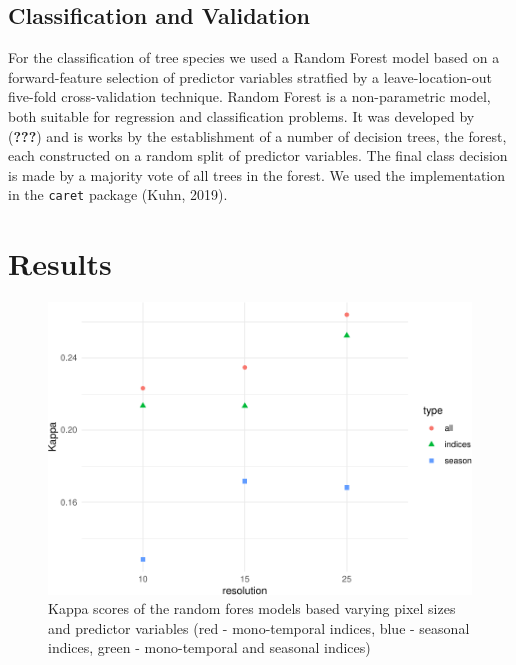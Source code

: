 \documentclass[]{article}
\begin{document}
\hypertarget{classification-and-validation}{%
\subsection{Classification and
Validation}\label{classification-and-validation}}

For the classification of tree species we used a Random Forest model
based on a forward-feature selection of predictor variables stratfied by
a leave-location-out five-fold cross-validation technique. Random Forest
is a non-parametric model, both suitable for regression and
classification problems. It was developed by ({\textbf{???}}) and is
works by the establishment of a number of decision trees, the forest,
each constructed on a random split of predictor variables. The final
class decision is made by a majority vote of all trees in the forest. We
used the implementation in the \texttt{caret} package (Kuhn, 2019).

\hypertarget{results}{%
\section{Results}\label{results}}

\begin{figure}[H]

{\centering \includegraphics[width=0.6\linewidth]{report_files/figure-latex/result_plots-1} 

}

\caption{Kappa scores of the random fores models based varying pixel sizes and predictor variables (red - mono-temporal indices, blue - seasonal indices, green - mono-temporal and seasonal indices)}\label{fig:result_plots}
\end{figure}
\end{document}
